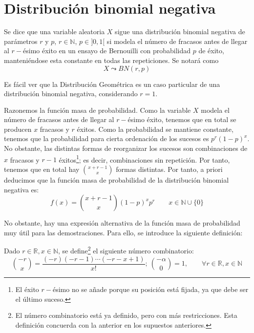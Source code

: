 \section{Distribución binomial negativa}
\begin{definicion}
    Se dice que una variable aleatoria $X$ sigue una distribución binomial negativa de parámetros $r$ y $p$, $r\in \mathbb{N}$, $p\in ]0,1[$ si modela el número de fracasos antes de llegar al $r-$ésimo éxito en un ensayo de Bernouilli con probabilidad $p$ de éxito, manteniéndose esta constante en todas las repeticiones. Se notará como $$X\leadsto BN(r,p)$$
\end{definicion}
\begin{observacion}
    Es fácil ver que la Distribución Geométrica es un caso particular de una distribución binomial negativa, considerando $r=1$.
\end{observacion}

Razonemos la función masa de probabilidad. Como la variable $X$ modela el número de fracasos antes de llegar al $r-$ésimo éxito, tenemos que en total se producen $x$ fracasos y $r$ éxitos. Como la probabilidad se mantiene constante, tenemos que la probabilidad para cierta ordenación de los sucesos es $p^r(1-p)^{x}$. No obstante, las distintas formas de reorganizar los sucesos son combinaciones de $x$ fracasos y $r-1$ éxitos\footnote{El éxito $r-$ésimo no se añade porque su posición está fijada, ya que debe ser el último suceso.}; es decir, combinaciones sin repetición. Por tanto, tenemos que en total hay $\binom{x+r-1}{x}$ formas distintas. Por tanto, a priori deducimos que la función masa de probabilidad de la distribución binomial negativa es:
\begin{equation*}
    f(x) = \binom{x+r-1}{x}(1-p)^{x}p^r \qquad x\in \mathbb{N}\cup \{0\}
\end{equation*}

No obstante, hay una expresión alternativa de la función masa de probabilidad muy útil para las demostraciones. Para ello, se introduce la siguiente definición:
\begin{definicion}
    Dado $r\in \mathbb{R}, x\in \mathbb{N}$, se define\footnote{El número combinatorio está ya definido, pero con más restricciones. Esta definición concuerda con la anterior en los supuestos anteriores.} el siguiente número combinatorio:
    \begin{equation*}
        \binom{-r}{x} = \frac{(-r)(-r-1)\cdots (-r-x+1)}{x!};~\binom{-\alpha}{0}=1, \qquad \forall r\in \mathbb{R}, x\in \mathbb{N}
    \end{equation*}
\end{definicion}

